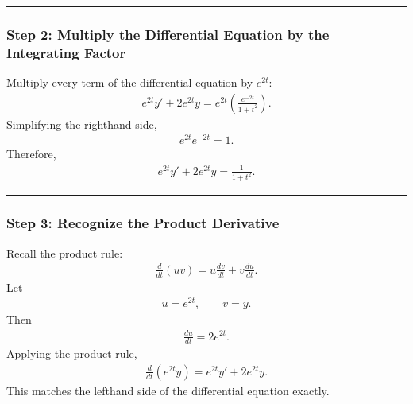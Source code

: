 \documentclass[letterpaper,10pt,english]{sphinxmanual}
\begin{document}
\bigskip\hrule\bigskip



\subsubsection{Step 2: Multiply the Differential Equation by the Integrating Factor}
\label{\detokenize{Language/Science_language/ODE_calculus/course_MATH_3035/homework_assignments/index_pdf:step-2-multiply-the-differential-equation-by-the-integrating-factor}}
\sphinxAtStartPar
Multiply every term of the differential equation by \(e^{2t}\):
\begin{equation*}
\begin{split}e^{2t}y' + 2e^{2t}y
=
e^{2t}\left(\frac{e^{-2t}}{1+t^2}\right).\end{split}
\end{equation*}
\sphinxAtStartPar
Simplifying the right\sphinxhyphen{}hand side,
\begin{equation*}
\begin{split}e^{2t}e^{-2t}=1.\end{split}
\end{equation*}
\sphinxAtStartPar
Therefore,
\begin{equation*}
\begin{split}e^{2t}y' + 2e^{2t}y
=
\frac{1}{1+t^2}.\end{split}
\end{equation*}

\bigskip\hrule\bigskip



\subsubsection{Step 3: Recognize the Product Derivative}
\label{\detokenize{Language/Science_language/ODE_calculus/course_MATH_3035/homework_assignments/index_pdf:step-3-recognize-the-product-derivative}}
\sphinxAtStartPar
Recall the product rule:
\begin{equation*}
\begin{split}\frac{d}{dt}(uv)
=
u\frac{dv}{dt}
+
v\frac{du}{dt}.\end{split}
\end{equation*}
\sphinxAtStartPar
Let
\begin{equation*}
\begin{split}u=e^{2t},
\qquad
v=y.\end{split}
\end{equation*}
\sphinxAtStartPar
Then
\begin{equation*}
\begin{split}\frac{du}{dt}=2e^{2t}.\end{split}
\end{equation*}
\sphinxAtStartPar
Applying the product rule,
\begin{equation*}
\begin{split}\frac{d}{dt}(e^{2t}y)
=
e^{2t}y'
+
2e^{2t}y.\end{split}
\end{equation*}
\sphinxAtStartPar
This matches the left\sphinxhyphen{}hand side of the differential equation exactly.
\end{document}
